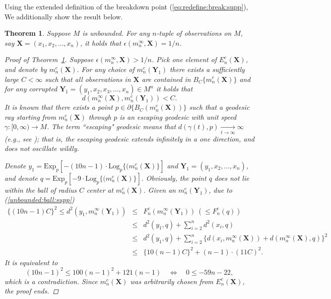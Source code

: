 \documentclass[preprint]{imsart}
\theoremstyle{plain}
\newtheorem{theorem}{Theorem}
\theoremstyle{remark}
\begin{document}
\begin{appendix}
Using the extended definition of the breakdown point (\ref{eq:redefine:break:supp}), We additionally show the result below.
\begin{theorem}
Suppose $M$ is unbounded. For any $n$-tuple of observations on $M$, say $\textbf{X}=(x_1, x_2, \ldots, x_n)$, it holds that  $\epsilon(m^{\infty}_{n},\mathbf{X})= 1/n$.  
\begin{proof}[Proof of Theorem~\ref{thm:frechet:zero:supp}]
Suppose $\epsilon(m^{\infty}_{n},\mathbf{X}) > 1/n$. Pick one element of $E^{c}_{n}(\mathbf{X})$, and denote by $m^{c}_{n}(\mathbf{X})$. For any choice of $m^{c}_{n}(\mathbf{Y}_1)$ there exists a sufficiently large $C < \infty$ such that all observations in $\mathbf{X}$ are contained in $B_{C}\{m^{c}_{n}(\mathbf{X})\}$ and for any corrupted $\textbf{Y}_{1}=(y_1, x_2, x_3, \ldots, x_n) \in M^n$ it holds that
\begin{equation}\label{unbounded:ball:supp}
d(m^{\infty}_{n}(\textbf{X}), m^{c}_{n}(\textbf{Y}_{1})) < C.
\end{equation}
It is known that there exists a point $p \in \partial\{B_{C}(m^{c}_{n}(\mathbf{X}))\}$ such that a geodesic ray starting from $m^{c}_{n}(\mathbf{X})$ through $p$ is an escaping geodesic with unit speed $\gamma:[0, \infty) \to M$. The term ``escaping" geodesic means that $d(\gamma(t), p) \underset{t\to \infty}{\to} \infty$ (e.g., see \citep[Exercise 7.6,][]{do1992riemannian}); that is, the escaping geodesic extends infinitely in a one direction, and does not oscillate wildly.

Denote $y_{1}= \mbox{Exp}_{p}[-(10n-1)\cdot \mbox{Log}_{p}\{(m^{c}_{n}(\mathbf{X})\}]$ and $\mathbf{Y}_{1}= (y_1, x_2, \ldots, x_n)$, and denote $q = \mbox{Exp}_{p}[-9\cdot\mbox{Log}_{p}\{(m^{c}_{n}(\mathbf{X})\}]$. Obviously, the point $q$ does not lie within the ball of radius $C$ center at $m^{c}_{n}(\mathbf{X})$. Given an $m^{c}_{n}(\mathbf{Y}_1)$, due to (\ref{unbounded:ball:supp}) 
\begin{eqnarray*}
\{(10n-1)C\}^2 \le d^2(y_1, m^{\infty}_{n}(\mathbf{Y}_{1})) &\le& F^{c}_{n}(m^{\infty}_{n}(\mathbf{Y}_{1})) ~ (\le F^{c}_{n}(q)) \\
&\le& d^2(y_1, q) + \sum_{i=2}^{n}d^2(x_i, q) \\ 
&\le& d^2(y_1, q) + \sum_{i=2}^{n} \{d(x_i, m^{\infty}_{n}(\mathbf{X})) + d(m^{\infty}_{n}(\mathbf{X}), q)\}^2 \\
&\le& \{10(n-1)C\}^2 + (n-1)\cdot (11C)^2.  
\end{eqnarray*}
It is equivalent to
\begin{equation*}
(10n-1)^2 \le 100(n-1)^2 + 121(n-1) \quad
\Leftrightarrow \quad 0 \le -59n - 22,
\end{equation*}
which is a contradiction. Since $m^{c}_{n}(\mathbf{X})$ was arbitrarily chosen from $E^{c}_{n}(\mathbf{X})$, the proof ends.
\end{proof}
\label{thm:frechet:zero:supp}
\end{theorem}


\end{appendix}
\end{document}
